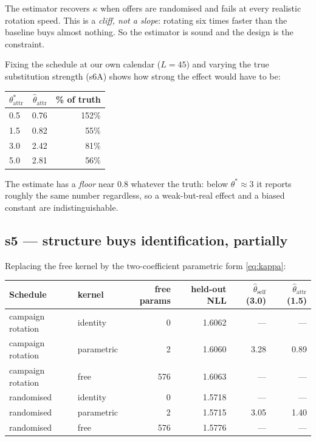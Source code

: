 \documentclass[11pt]{article}
\begin{document}
\noindent The estimator recovers $\kappa$ when offers are randomised and fails
at every realistic rotation speed. This is a \emph{cliff, not a slope}:
rotating six times faster than the baseline buys almost nothing. So the
estimator is sound and the design is the constraint.

Fixing the schedule at our own calendar ($L = 45$) and varying the true
substitution strength (s6A) shows how strong the effect would have to be:

\begin{center}\small
\begin{tabular}{lrr}
\toprule
$\theta_{\text{attr}}^{*}$ & $\hat\theta_{\text{attr}}$ & \% of truth \\
\midrule
0.5 & 0.76 & 152\% \\
1.5 & 0.82 & 55\% \\
3.0 & 2.42 & 81\% \\
5.0 & 2.81 & 56\% \\
\bottomrule
\end{tabular}
\end{center}

\noindent The estimate has a \emph{floor} near $0.8$ whatever the truth: below
$\theta^{*}\approx 3$ it reports roughly the same number regardless, so a
weak-but-real effect and a biased constant are indistinguishable.

\subsection{s5 --- structure buys identification, partially}

Replacing the free kernel by the two-coefficient parametric form
\eqref{eq:kappa}:

\begin{center}\small
\begin{tabular}{llrrrr}
\toprule
Schedule & kernel & free params & held-out NLL & $\hat\theta_{\text{self}}$ (3.0) & $\hat\theta_{\text{attr}}$ (1.5) \\
\midrule
campaign rotation & identity & 0 & 1.6062 & --- & --- \\
campaign rotation & parametric & 2 & 1.6060 & 3.28 & 0.89 \\
campaign rotation & free & 576 & 1.6063 & --- & --- \\
randomised & identity & 0 & 1.5718 & --- & --- \\
randomised & parametric & 2 & 1.5715 & 3.05 & 1.40 \\
randomised & free & 576 & 1.5776 & --- & --- \\
\bottomrule
\end{tabular}
\end{center}
\end{document}
